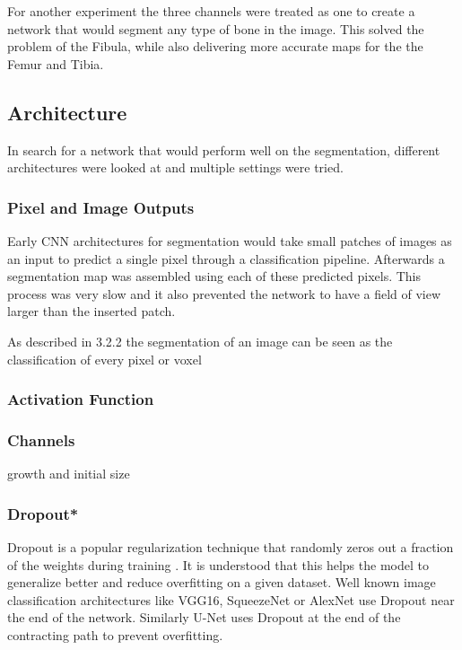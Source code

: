 For another experiment the three channels were treated as one to create a network that would segment any type of bone in the image. This solved the problem of the Fibula, while also delivering more accurate maps for the the Femur and Tibia.

\subsection{Architecture}

In search for a network that would perform well on the segmentation, different architectures were looked at and multiple settings were tried.

\subsubsection{Pixel and Image Outputs}

Early CNN architectures for segmentation would take small patches of images as an input to predict a single pixel through a classification pipeline. Afterwards a segmentation map was assembled using each of these predicted pixels. This process was very slow and it also prevented the network to have a field of view larger than the inserted patch.



As described in 3.2.2 the segmentation of an image can be seen as the classification of every pixel or voxel

\subsubsection{Activation Function}


\subsubsection{Channels}

growth and initial size

\subsubsection{Dropout*}

Dropout is a popular regularization technique that randomly zeros out a fraction of the weights during training \cite{Srivastava2014}. It is understood that this helps the model to generalize better and reduce overfitting on a given dataset. Well known image classification architectures like VGG16, SqueezeNet or AlexNet use Dropout near the end of the network. Similarly U-Net uses Dropout at the end of the contracting path to prevent overfitting.

